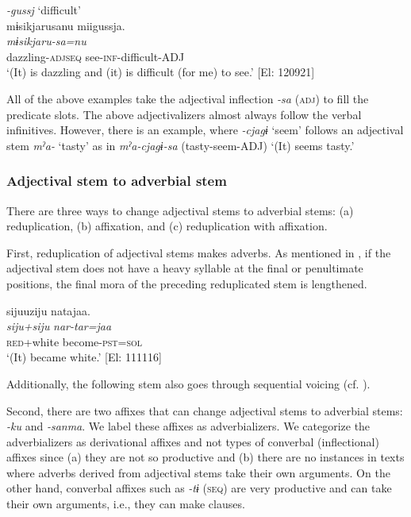 \ex \textit{-gussj} ‘difficult’\\
\glll      mɨsikjarusanu  miigussja.\\
      \textit{mɨsikjaru-sa=nu}  \textit{}\\
      dazzling-\textsc{adj}\textsc{seq}  see-\textsc{inf}-difficult-ADJ\\
      \glt       ‘(It) is dazzling and (it) is difficult (for me) to see.’ [El: 120921]
     \z
\z

All of the above examples take the adjectival inflection \textit{{}-sa} (\textsc{adj}) to fill the predicate slots. The above adjectivalizers almost always follow the verbal infinitives. However, there is an example, where \textit{-cjagɨ} ‘seem’ follows an adjectival stem \textit{mˀa-} ‘tasty’ as in \textit{mˀa-cjagɨ-sa} (tasty-seem-ADJ) ‘(It) seems tasty.’

\subsubsection{Adjectival stem to adverbial stem}\label{sec:4.3.8.3}

There are three ways to change adjectival stems to adverbial stems: (a) reduplication, (b) affixation, and (c) reduplication with affixation.

  First, reduplication of adjectival stems makes adverbs. As mentioned in , if the adjectival stem does not have a heavy syllable at the final or penultimate positions, the final mora of the preceding reduplicated stem is lengthened.

\ea   \label{ex:4.60}
\glll    sijuuziju  natajaa.\\
    \textit{siju+siju}  \textit{nar-tar=jaa}\\
    \textsc{red}+white  become-\textsc{pst}=\textsc{sol}\\
    \glt     ‘(It) became white.’ [El: 111116]
\z

Additionally, the following stem also goes through sequential voicing (cf. ).

Second, there are two affixes that can change adjectival stems to adverbial stems: \textit{{}-ku} and \textit{{}-sanma}. We label these affixes as adverbializers. We categorize the adverbializers as derivational affixes and not types of converbal (inflectional) affixes since (a) they are not so productive and (b) there are no instances in texts where adverbs derived from adjectival stems take their own arguments. On the other hand, converbal affixes such as \textit{{}-tɨ} (\textsc{seq}) are very productive and can take their own arguments, i.e., they can make clauses.


